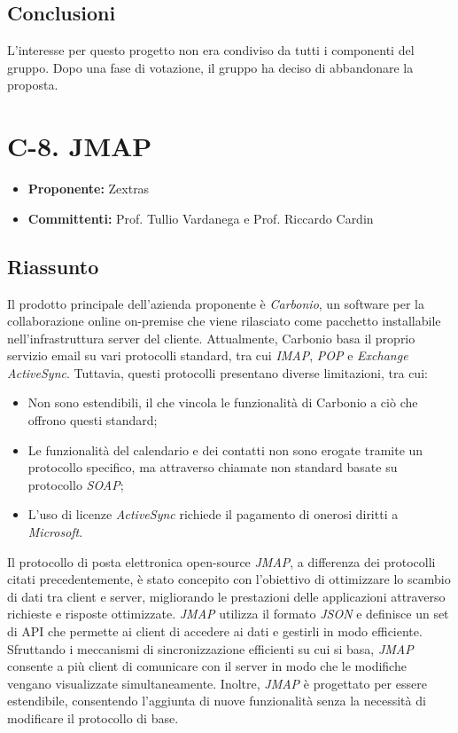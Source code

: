 \documentclass{article}
\begin{document}
\subsection{Conclusioni}
L’interesse per questo progetto non era condiviso da tutti i componenti del gruppo. Dopo una fase di votazione, il gruppo ha deciso di abbandonare la proposta.

\newpage

\section{C-8. JMAP}
\begin{itemize}
    \item \textbf{Proponente:} Zextras
    \item \textbf{Committenti:}  Prof. Tullio Vardanega e Prof. Riccardo Cardin
\end{itemize}

\subsection{Riassunto}
Il prodotto principale dell'azienda proponente è \textit{Carbonio}, un software per la collaborazione online on-premise che viene rilasciato come pacchetto installabile nell'infrastruttura server del cliente.
Attualmente, Carbonio basa il proprio servizio email su vari protocolli standard, tra cui \textit{IMAP}, \textit{POP} e \textit{Exchange ActiveSync}. Tuttavia, questi protocolli presentano diverse limitazioni, tra cui:

\begin{itemize}
    \item Non sono estendibili, il che vincola le funzionalità di Carbonio a ciò che offrono questi standard;
    \item Le funzionalità del calendario e dei contatti non sono erogate tramite un protocollo specifico, ma attraverso chiamate non standard basate su protocollo \textit{SOAP};
    \item L'uso di licenze \textit{ActiveSync} richiede il pagamento di onerosi diritti a \textit{Microsoft}.
\end{itemize}

Il protocollo di posta elettronica open-source \textit{JMAP}, a differenza dei protocolli citati precedentemente, è stato concepito con l'obiettivo di ottimizzare lo scambio di dati tra client e server, migliorando le prestazioni delle applicazioni attraverso richieste e risposte ottimizzate.
\textit{JMAP} utilizza il formato \textit{JSON} e definisce un set di API che permette ai client di accedere ai dati e gestirli in modo efficiente.
Sfruttando i meccanismi di sincronizzazione efficienti su cui si basa, \textit{JMAP} consente a più client di comunicare con il server in modo che le modifiche vengano visualizzate simultaneamente. Inoltre, \textit{JMAP} è progettato per essere estendibile, consentendo l'aggiunta di nuove funzionalità senza la necessità di modificare il protocollo di base.
\end{document}
